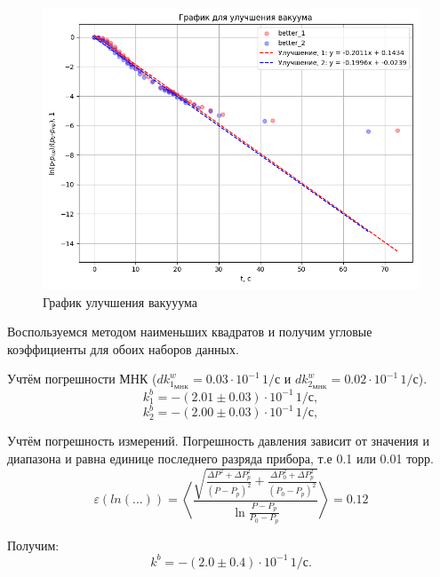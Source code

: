 \documentclass[a4paper,12pt]{article} %
\begin{document}
\begin{enumerate}
\begin{enumerate}
        \begin{figure}[h!]
          \centering
          \includegraphics[scale = 0.75]{graph_better.png}
          \caption{График улучшения вакууума}
          \label{fig:better}
        \end{figure}

        Воспользуемся методом наименьших квадратов и получим угловые коэффициенты для обоих наборов данных.

        Учтём погрешности МНК ($dk^w_{1_{\text{МНК}}} = 0.03 \cdot 10^{-1} \, 1/\text{с}$ и $dk^w_{2_{\text{МНК}}} = 0.02 \cdot 10^{-1} \, 1/\text{с}$). 
        \begin{equation}
          k^b_1 = -(2.01 \pm 0.03) \cdot 10^{-1} \, 1/\text{с},
        \end{equation}
        \begin{equation}
          k^b_2 = -(2.00 \pm 0.03) \cdot 10^{-1} \, 1/\text{с},
        \end{equation}

        Учтём погрешность измерений. Погрешность давления зависит от значения и диапазона и равна единице последнего разряда прибора, т.е 0.1 или 0.01 торр.
        \begin{equation}
          \varepsilon(ln(\dots)) = \left\langle \frac{\sqrt{\frac{\Delta P^2 + \Delta P_p^2}{(P - P_p)^2} + \frac{\Delta P_0^2 + \Delta P_p^2}{(P_0 - P_p)^2}}}{\ln \frac{P - P_p}{P_0 - P_p}} \right\rangle = 0.12
        \end{equation}
        
        Получим:
        \begin{equation}
          k^b = -(2.0 \pm 0.4) \cdot 10^{-1} \, 1/\text{с}.
        \end{equation}


\end{enumerate}
\end{enumerate}
\end{document}

